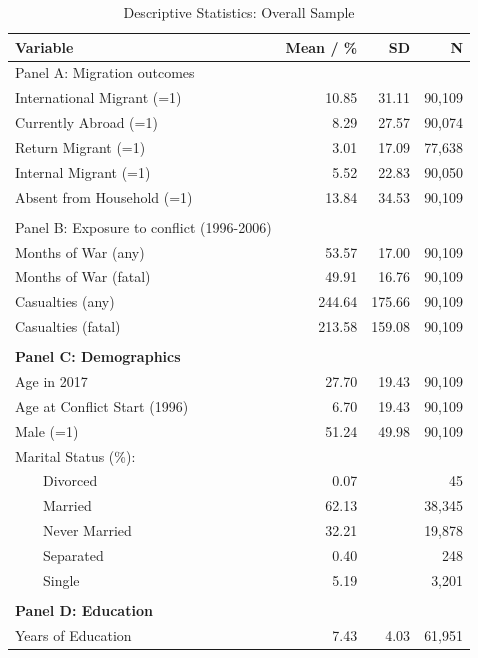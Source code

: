 \begin{table}[!h]
\centering
\caption{\label{tab:tab:overall_summary}Descriptive Statistics: Overall Sample}
\centering
\fontsize{10}{12}\selectfont
\begin{threeparttable}
\begin{tabular}[t]{lrrr}
\toprule
Variable & Mean / \% & SD & N\\
\midrule
Panel A: Migration outcomes &  &  \vphantom{4} & \\
International Migrant (=1) & 10.85 & 31.11 & 90,109\\
Currently Abroad (=1) & 8.29 & 27.57 & 90,074\\
Return Migrant (=1) & 3.01 & 17.09 & 77,638\\
Internal Migrant (=1) & 5.52 & 22.83 & 90,050\\
\addlinespace
Absent from Household (=1) & 13.84 & 34.53 & 90,109\\
 &  &  \vphantom{3} & \\
Panel B: Exposure to conflict (1996-2006) &  &  \vphantom{2} & \\
Months of War (any) & 53.57 & 17.00 & 90,109\\
Months of War (fatal) & 49.91 & 16.76 & 90,109\\
\addlinespace
Casualties (any) & 244.64 & 175.66 & 90,109\\
Casualties (fatal) & 213.58 & 159.08 & 90,109\\
 &  &  \vphantom{1} & \\
\textbf{Panel C: Demographics} & \textbf{} & \textbf{} & \textbf{}\\
Age in 2017 & 27.70 & 19.43 & 90,109\\
\addlinespace
Age at Conflict Start (1996) & 6.70 & 19.43 & 90,109\\
Male (=1) & 51.24 & 49.98 & 90,109\\
Marital Status (\%): &  &  & \\
    Divorced & 0.07 &  & 45\\
    Married & 62.13 &  & 38,345\\
\addlinespace
    Never Married & 32.21 &  & 19,878\\
    Separated & 0.40 &  & 248\\
    Single & 5.19 &  & 3,201\\
 &  &  & \\
\textbf{Panel D: Education} & \textbf{} & \textbf{} & \textbf{}\\
\addlinespace
Years of Education & 7.43 & 4.03 & 61,951\\

\end{tabular}
\end{threeparttable}
\end{table}
